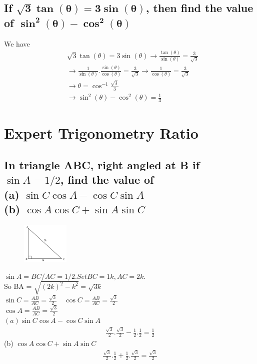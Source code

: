 \documentclass{article}
\begin{document}
\begin{multicols}{2}

\subsection{If $\mathbf{\sqrt{3}\tan(\theta)=3\sin(\theta)}$, then find the value of $\mathbf{\sin^2(\theta)-\cos^2(\theta)}$ }

We have
\begin{align*}
    &\sqrt{3} \tan(\theta) = 3\sin(\theta) \rightarrow \frac{\tan(\theta)}{\sin(\theta)} = \frac{3}{\sqrt{3}} \\
    & \rightarrow \frac{1}{\sin(\theta)}.\frac{\sin(\theta)}{\cos(\theta)} = \frac{3}{\sqrt{3}} \rightarrow \frac{1}{\cos(\theta)} = \frac{3}{\sqrt{3}} \\
    & \rightarrow \theta = \cos^{-1}{\frac{\sqrt{3}}{3}} \\
    & \rightarrow \sin^2(\theta) - \cos^2(\theta) = \frac{1}{3}
\end{align*}


\section{Expert Trigonometry Ratio}

\subsection{In triangle ABC, right angled at B if $\sin A = 1/2$, find the value of \\
(a) $\sin C \cos A - \cos C \sin A$ \\
(b) $\cos A \cos C + \sin A \sin C$
}

\begin{figure}[H]
    \centering
    \includegraphics[width=0.2\textwidth]{expert-Tr2.png}
\end{figure}

\noindent $\sin A = BC/AC = 1/2. Set BC = 1k, AC = 2k.$ \\
So BA = $\sqrt{(2k)^2-k^2} = \sqrt{3k}$ \\
$\sin C = \frac{AB}{AC} = \frac{\sqrt{3}}{2} \quad \cos C=\frac{AB}{AC} = \frac{\sqrt{3}}{2}$ \\
$\cos A= \frac{AB}{AC} = \frac{\sqrt{3}}{2}$ \\
$(a) \sin C \cos A - \cos C \sin A $\\
\begin{align*}
    \frac{\sqrt{3}}{2}.\frac{\sqrt{3}}{2} - \frac{1}{2}.\frac{1}{2}= \frac{1}{2} 
\end{align*}
(b) $\cos A \cos C + \sin A \sin C$
\begin{align*}
    \frac{\sqrt{3}}{2}.\frac{1}{2} + \frac{1}{2}.\frac{\sqrt{3}}{2}= \frac{\sqrt{3}}{2} 
\end{align*}

\end{multicols}
\end{document}
